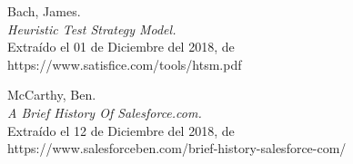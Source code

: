 \begin{thebibliography}{99}

 Bach, James.\\
\emph{Heuristic Test Strategy Model.}\\
Extraído el 01 de Diciembre del 2018, de\\
https://www.satisfice.com/tools/htsm.pdf

 McCarthy, Ben.\\
    \emph{A Brief History Of Salesforce.com.}\\
Extraído el 12 de Diciembre del 2018, de\\
https://www.salesforceben.com/brief-history-salesforce-com/

\end{thebibliography}


